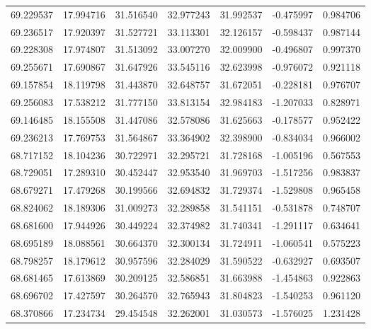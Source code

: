 \begin{tabular}{rrrrrrr}
 69.229537 &  17.994716 &         31.516540 &         32.977243 &         31.992537 & -0.475997 &  0.984706 \\
 69.236517 &  17.920397 &         31.527721 &         33.113301 &         32.126157 & -0.598437 &  0.987144 \\
 69.228308 &  17.974807 &         31.513092 &         33.007270 &         32.009900 & -0.496807 &  0.997370 \\
 69.255671 &  17.690867 &         31.647926 &         33.545116 &         32.623998 & -0.976072 &  0.921118 \\
 69.157854 &  18.119798 &         31.443870 &         32.648757 &         31.672051 & -0.228181 &  0.976707 \\
 69.256083 &  17.538212 &         31.777150 &         33.813154 &         32.984183 & -1.207033 &  0.828971 \\
 69.146485 &  18.155508 &         31.447086 &         32.578086 &         31.625663 & -0.178577 &  0.952422 \\
 69.236213 &  17.769753 &         31.564867 &         33.364902 &         32.398900 & -0.834034 &  0.966002 \\
 68.717152 &  18.104236 &         30.722971 &         32.295721 &         31.728168 & -1.005196 &  0.567553 \\
 68.729051 &  17.289310 &         30.452447 &         32.953540 &         31.969703 & -1.517256 &  0.983837 \\
 68.679271 &  17.479268 &         30.199566 &         32.694832 &         31.729374 & -1.529808 &  0.965458 \\
 68.824062 &  18.189306 &         31.009273 &         32.289858 &         31.541151 & -0.531878 &  0.748707 \\
 68.681600 &  17.944926 &         30.449224 &         32.374982 &         31.740341 & -1.291117 &  0.634641 \\
 68.695189 &  18.088561 &         30.664370 &         32.300134 &         31.724911 & -1.060541 &  0.575223 \\
 68.798257 &  18.179612 &         30.957596 &         32.284029 &         31.590522 & -0.632927 &  0.693507 \\
 68.681465 &  17.613869 &         30.209125 &         32.586851 &         31.663988 & -1.454863 &  0.922863 \\
 68.696702 &  17.427597 &         30.264570 &         32.765943 &         31.804823 & -1.540253 &  0.961120 \\
 68.370866 &  17.234734 &         29.454548 &         32.262001 &         31.030573 & -1.576025 &  1.231428 \\

\end{tabular}
